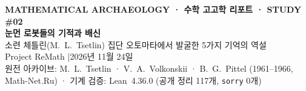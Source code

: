 \documentclass[11pt,a4paper]{article}
\begin{document}
\begin{center}
  {\sffamily\footnotesize\bfseries\color{teal} MATHEMATICAL ARCHAEOLOGY · 수학 고고학 리포트 · STUDY \#02}\\[0.55em]
  {\sffamily\huge\bfseries\color{navy} 눈먼 로봇들의 기적과 배신}\\[0.42em]
  {\sffamily\large\color{darkgray} 소련 체틀린(M.~L.~Tsetlin) 집단 오토마타에서 발굴한 5가지 기억의 역설}\\[0.85em]
  {\sffamily\small Project ReMath \quad|\quad 2026년 11월 24일}\\[0.25em]
  {\footnotesize\color{gray} 원전 아카이브: M.~L.~Tsetlin · V.~A.~Volkonskii · B.~G.~Pittel (1961--1966, Math-Net.Ru) · 기계 검증: Lean~4.36.0 (공개 정리 117개, \texttt{sorry} 0개)}
\end{center}

\vspace{0.3em}
\end{document}
